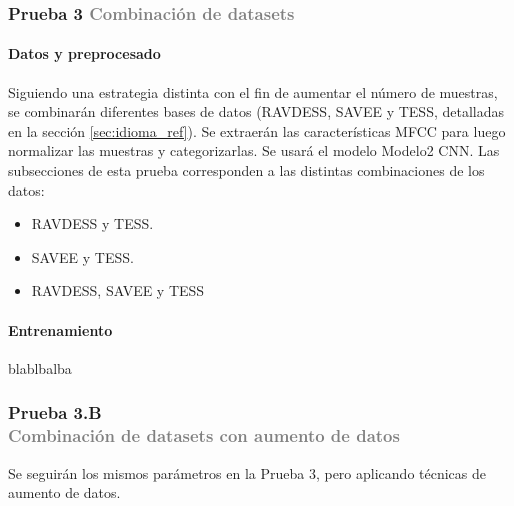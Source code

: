 \documentclass[11pt,a4paper,spanish]{book}
\begin{document}
	\subsubsection[]{\large Prueba 3 {\normalsize \textcolor{Gray}{Combinación de datasets}}}
	
	\hfill\begin{minipage}{\dimexpr\textwidth-1cm}
		
		\paragraph{Datos y preprocesado} Siguiendo una estrategia distinta con el fin de aumentar el número de muestras, se combinarán diferentes bases de datos (RAVDESS, SAVEE y TESS, detalladas en la sección \ref{sec:idioma_ref}). Se extraerán las características MFCC para luego normalizar las muestras y categorizarlas.
		Se usará el modelo Modelo2 CNN. Las subsecciones de esta prueba corresponden a las distintas combinaciones de los datos:
		\begin{itemize}
			\item RAVDESS y TESS.
			\item SAVEE y TESS.
			\item RAVDESS, SAVEE y TESS
		\end{itemize}
	
		\paragraph{Entrenamiento} blablbalba
	\end{minipage}

	\subsubsection[]{\large Prueba 3.B\\ {\normalsize \textcolor{Gray}{Combinación de datasets con aumento de datos}}}
	Se seguirán los mismos parámetros en la Prueba 3, pero aplicando técnicas de aumento de datos.
	
\end{document}
